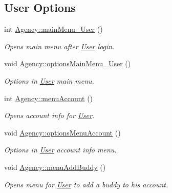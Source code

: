 \subsection*{User Options}
\begin{DoxyCompactItemize}
\item 
int \hyperlink{group___agency_gaef1bbd6021ec5639b2503d8bd8ec4244}{Agency\+::main\+Menu\+\_\+\+User} ()
\begin{DoxyCompactList}\small\item\em Opens main menu after \hyperlink{class_user}{User} login. \end{DoxyCompactList}\item 
\mbox{\label{group___agency_ga2199b59e94702baecd1589a7bf03ebcb}} 
void \hyperlink{group___agency_ga2199b59e94702baecd1589a7bf03ebcb}{Agency\+::options\+Main\+Menu\+\_\+\+User} ()
\begin{DoxyCompactList}\small\item\em Options in \hyperlink{class_user}{User} main menu. \end{DoxyCompactList}\item 
\mbox{\label{group___agency_ga108fc523a3e0545820e63741982e9327}} 
int \hyperlink{group___agency_ga108fc523a3e0545820e63741982e9327}{Agency\+::menu\+Account} ()
\begin{DoxyCompactList}\small\item\em Opens account info for \hyperlink{class_user}{User}. \end{DoxyCompactList}\item 
\mbox{\label{group___agency_ga580e845616f281e993d39e6a87b9725e}} 
void \hyperlink{group___agency_ga580e845616f281e993d39e6a87b9725e}{Agency\+::options\+Menu\+Account} ()
\begin{DoxyCompactList}\small\item\em Options in \hyperlink{class_user}{User} account info menu. \end{DoxyCompactList}\item 
\mbox{\label{group___agency_gabbb862b2f97a318773851b4ebeb3de8a}} 
void \hyperlink{group___agency_gabbb862b2f97a318773851b4ebeb3de8a}{Agency\+::menu\+Add\+Buddy} ()
\begin{DoxyCompactList}\small\item\em Opens menu for \hyperlink{class_user}{User} to add a buddy to his account. \end{DoxyCompactList}\item 

\end{DoxyCompactItemize}

